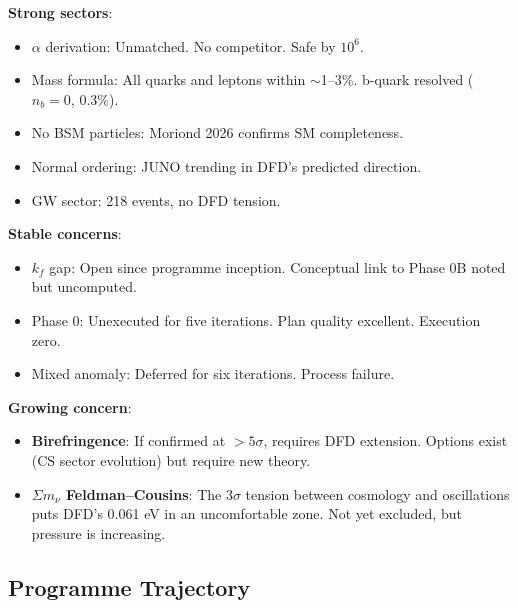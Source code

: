 \documentclass[11pt,a4paper]{article}
\begin{document}
\begin{tcolorbox}[colback=green!5!white, colframe=green!60!black,
  title={Theory Health: Stable, with One Growing Concern}]

\textbf{Strong sectors}:
\begin{itemize}
\item $\alpha$ derivation: Unmatched. No competitor. Safe by $10^6$.
\item Mass formula: All quarks and leptons within $\sim$1--3\%. b-quark resolved ($n_b = 0$, 0.3\%).
\item No BSM particles: Moriond 2026 confirms SM completeness.
\item Normal ordering: JUNO trending in DFD's predicted direction.
\item GW sector: 218 events, no DFD tension.
\end{itemize}

\textbf{Stable concerns}:
\begin{itemize}
\item $k_f$ gap: Open since programme inception. Conceptual link to Phase 0B noted but uncomputed.
\item Phase 0: Unexecuted for five iterations. Plan quality excellent. Execution zero.
\item Mixed anomaly: Deferred for six iterations. Process failure.
\end{itemize}

\textbf{Growing concern}:
\begin{itemize}
\item \textbf{Birefringence}: If confirmed at $> 5\sigma$, requires DFD extension. Options exist (CS sector evolution) but require new theory.
\item \textbf{$\Sigma m_\nu$ Feldman--Cousins}: The $3\sigma$ tension between cosmology and oscillations puts DFD's 0.061 eV in an uncomfortable zone. Not yet excluded, but pressure is increasing.
\end{itemize}
\end{tcolorbox}

\subsection{Programme Trajectory}
\end{document}

